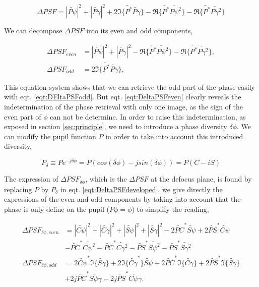 \begin{equation}
\Delta PSF = |\widetilde{P\psi}|^2 + |\widetilde{P\gamma}|^2 + 2\Im\lbrace \widetilde{P^*}\widetilde{P \gamma}\rbrace - \Re\lbrace \widetilde{P^*}\widetilde{P \psi^2}\rbrace- \Re\lbrace \widetilde{P^*}\widetilde{P \gamma^2}\rbrace
\label{eqt:DeltaPSFdeveloped}
\end{equation}

We can decompose $\Delta PSF$ into its even and odd components,

\begin{align}
\Delta PSF_{even} &= |\widetilde{P\psi}|^2 + |\widetilde{P\gamma}|^2 - \Re\lbrace \widetilde{P^*}\widetilde{P \psi^2}\rbrace- \Re\lbrace \widetilde{P^*}\widetilde{P \gamma^2}\rbrace, \label{eqt:DeltaPSFeven}\\
\Delta PSF_{odd} &= 2\Im\lbrace \widetilde{P^*}\widetilde{P \gamma}\rbrace \label{eqt:DEltaPSFodd},
\end{align}

This equation system shows that we can retrieve the odd part of the phase easily with eqt. \eqref{eqt:DEltaPSFodd}. But eqt. \eqref{eqt:DeltaPSFeven} clearly reveals the indetermination of the phase retrieval with only one image, as the sign of the even part of $\phi$ can not be determine. In order to raise this indetermination, as exposed in section \ref{sec:principle}, we need to introduce a phase diversity $\delta\phi$. We can modify the pupil function $P$ in order to take into account this introduced diversity,

\begin{equation}
P_{\delta} \equiv P e^{-j\delta\phi} = P(cos(\delta\phi)-jsin(\delta\phi)) = P(C-iS) 
\label{eqt:pupilDeltaphi}
\end{equation}

The expression of $\Delta PSF_{\delta\phi}$, which is the $\Delta PSF$ at the defocus plane, is found by replacing $P$ by $P_{\delta}$ in eqt. \eqref{eqt:DeltaPSFdeveloped}, we give directly the expressions of the even and odd components by taking into account that the phase is only define on the pupil ($P\phi=\phi$) to simplify the reading,

\begin{align}
\Delta PSF_{\delta\phi, even} &= |\widetilde{C\psi}|^2 + |\widetilde{C\gamma}|^2 +|\widetilde{S\psi}|^2 + |\widetilde{S\gamma}|^2 -2\widetilde{PC}^*\widetilde{S\psi}+2\widetilde{PS}^*\widetilde{C\psi} \nonumber\\
&-\widetilde{PC}^*\widetilde{C\psi^2}-\widetilde{PC}^*\widetilde{C\gamma^2}-\widetilde{PS}^*\widetilde{S\psi^2}-\widetilde{PS}^*\widetilde{S\gamma^2} \label{eqt:DeltaPSFevenDef}\\
\Delta PSF_{\delta\phi, odd} &= 2\widetilde{C\psi}^*\Im\lbrace\widetilde{S\gamma}\rbrace+2\Im\lbrace\widetilde{C\gamma}^*\rbrace\widetilde{S\psi}+2\widetilde{PC}^*\Im\lbrace\widetilde{C\gamma}\rbrace+2\widetilde{PS}^*\Im\lbrace\widetilde{S\gamma}\rbrace \nonumber\\
&+2j\widetilde{PC}^*\widetilde{S\psi\gamma}-2j\widetilde{PS}^*\widetilde{C\psi\gamma}.\label{eqt:DeltaPSFoddDef}
\end{align}

